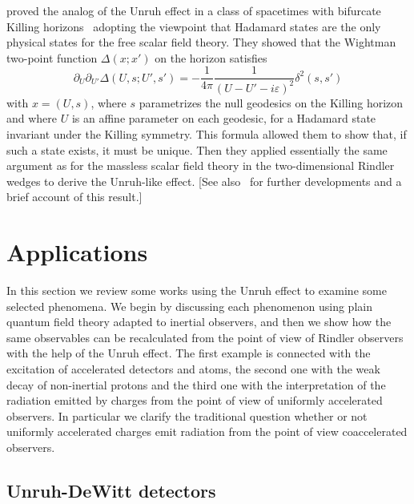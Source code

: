 \documentclass[12pt,nofootinbib,floatfix,aps,prd,showpacs,amsmath,amssymb,eqsecnum]{revtex4-2}
\begin{document}
\textcite{Kayetal91} proved the analog of the Unruh effect in a class of
spacetimes with bifurcate Killing horizons~\cite{Boyer69} adopting the
viewpoint that 
Hadamard states are the only physical 
states for the free
scalar field theory.  They showed that the Wightman two-point function
$\Delta(x;x')$ on the horizon satisfies
\begin{equation}
\partial_{U}\partial_{U'}\Delta(U,s;U',s') = -
\frac{1}{4\pi}\frac{1}{(U-U'-i\varepsilon)^2}\delta^2(s,s')
\end{equation}
with $x=(U,s)$, where $s$ parametrizes 
the null geodesics on the Killing
horizon and where $U$ is an affine parameter on each geodesic, for a
Hadamard state invariant under the Killing symmetry.  This
formula allowed them to show that, if such a state exists, it must be
unique. Then they applied essentially the same argument as for the
massless scalar field theory in the two-dimensional Rindler wedges to
derive the Unruh-like effect. 
[See also~\textcite{Kay93,Kay01} for further
developments and a brief account of this result.]

\section{Applications}
\label{section:Applications}

In this section we review some works using
the Unruh effect to examine some 
selected phenomena. We begin by discussing
each phenomenon using plain quantum field theory adapted to inertial
observers, and then we show how the same observables can be recalculated
from the point of view of Rindler observers with the help of the 
Unruh effect. The first example is connected with the excitation of 
accelerated detectors and atoms, the second one with the weak decay of 
non-inertial protons and the third one with the interpretation of 
the radiation emitted by charges from the point of view of uniformly 
accelerated observers. In particular we clarify the traditional 
question whether or not uniformly accelerated charges emit radiation 
from the point of view coaccelerated observers. 

\subsection{Unruh-DeWitt detectors}
\label{subsection:detector}
\end{document}
